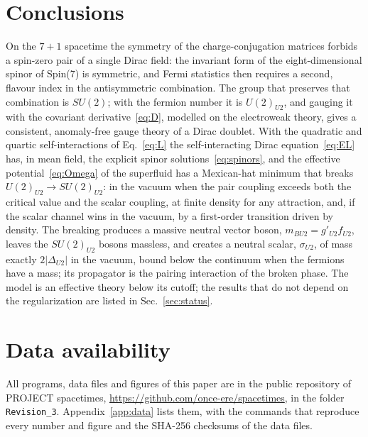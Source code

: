 \section{Conclusions}
\label{sec:conclusions}

On the $7+1$ spacetime the symmetry of the charge-conjugation matrices forbids a spin-zero pair of a
single Dirac field: the invariant form of the eight-dimensional spinor of Spin(7) is symmetric, and
Fermi statistics then requires a second, flavour index in the antisymmetric combination. The group that
preserves that combination is $SU(2)$; with the fermion number it is $U(2)_{U2}$, and gauging it with the
covariant derivative~\eqref{eq:D}, modelled on the electroweak theory, gives a consistent,
anomaly-free gauge theory of a Dirac doublet. With the quadratic and quartic self-interactions of
Eq.~\eqref{eq:L} the self-interacting Dirac equation~\eqref{eq:EL} has, in mean field, the explicit
spinor solutions~\eqref{eq:spinors}, and the effective potential~\eqref{eq:Omega} of the superfluid has
a Mexican-hat minimum that breaks $U(2)_{U2}\to SU(2)_{U2}$: in the vacuum when the pair coupling exceeds
both the critical value and the scalar coupling, at finite density for any attraction, and, if the
scalar channel wins in the vacuum, by a first-order transition driven by density. The breaking
produces a massive neutral vector boson, $m_{BU2}=g'_{U2}f_{U2}$, leaves the $SU(2)_{U2}$ bosons massless,
and creates a neutral scalar, $\sigma_{U2}$, of mass exactly $2|\Delta_{U2}|$ in the vacuum, bound below
the continuum when the fermions have a mass; its propagator is the pairing interaction of the broken
phase. The model is an effective theory below its cutoff; the results that do not depend on the
regularization are listed in Sec.~\ref{sec:status}.

\section*{Data availability}

All programs, data files and figures of this paper are in the public repository of PROJECT
spacetimes, \url{https://github.com/once-ere/spacetimes}, in the folder \texttt{Revision\_3}.
Appendix~\ref{app:data} lists them, with the commands that reproduce every number and figure and the
SHA-256 checksums of the data files.
